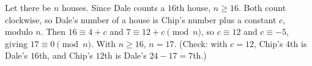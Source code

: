 Let there be $n$ houses. Since Dale counts a $16$th house, $n\ge16$. Both count clockwise, so Dale's number of a house is Chip's number plus a constant $c$, modulo $n$. Then $16\equiv4+c$ and $7\equiv12+c\pmod n$, so $c\equiv12$ and $c\equiv-5$, giving $17\equiv0\pmod n$. With $n\ge16$, $n=\boxed{17}$. (Check: with $c=12$, Chip's $4$th is Dale's $16$th, and Chip's $12$th is Dale's $24-17=7$th.)
